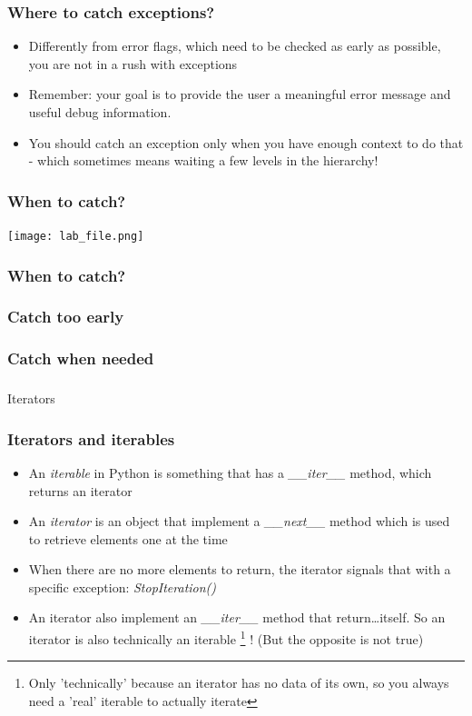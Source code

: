 \documentclass[9pt]{beamer}
\begin{document}
\begin{frame}
  \frametitle{Where to catch exceptions?}
  \begin{itemize}
    \item Differently from error flags, which need to be checked as early as
          possible, you are not in a rush with exceptions
    \item Remember: your goal is to provide the user a meaningful error message and
          useful debug information.
    \item You should catch an exception only when you have enough context to
          do that - which sometimes means waiting a few levels in the hierarchy!
  \end{itemize}
\end{frame}


\begin{frame}
  \frametitle{When to catch?}
  \centering
  \texttt{[image: lab\_file.png]}
\end{frame}


\begin{frame}
  \frametitle{When to catch?}
  
\end{frame}


\begin{frame}
  \frametitle{Catch too early}
  
\end{frame}


\begin{frame}
  \frametitle{Catch when needed}
  
\end{frame}


\begin{frame}
  \frametitle{}
  \centering \Large Iterators
\end{frame}


\begin{frame}
  \frametitle{Iterators and iterables}
  
  \begin{itemize}
    \item An \emph{iterable} in Python is something that has a \emph{\_\_iter\_\_}
          method, which returns an \alert{iterator}
    \medskip
    \item An \emph{iterator} is an object that implement a \emph{\_\_next\_\_} method
          which is used to retrieve elements one at the time
    \medskip
    \item When there are no more elements to return, the iterator signals that with a specific
          exception: \emph{StopIteration()}
    \medskip
    \item An iterator also implement an \emph{\_\_iter\_\_} method that return\dots itself.
          So an iterator is also technically an iterable%
          \footnote{Only 'technically' because an iterator has no data of its
          own, so you always need a 'real' iterable to actually iterate}%
          ! (But the opposite is not true)
  \end{itemize}
  
\end{frame}
\end{document}
